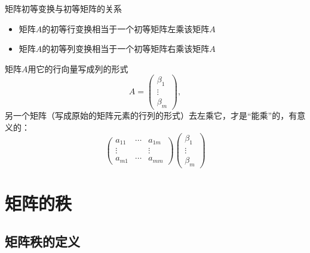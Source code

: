 \begin{frame}

\begin{block}{矩阵初等变换与初等矩阵的关系}
\begin{itemize}
\item 矩阵$A$的初等{\color{red}行}变换相当于一个初等矩阵{\color{red}左乘}该矩阵$A$
\item 矩阵$A$的初等{\color{green}列}变换相当于一个初等矩阵{\color{green}右乘}该矩阵$A$
\end{itemize}
\end{block}

\pause

矩阵$A$用它的行向量写成列的形式
$$A = \begin{pmatrix}
\beta_1 \\ \vdots \\ \beta_m
\end{pmatrix},$$
另一个矩阵（写成原始的矩阵元素的行列的形式）去左乘它，才是``能乘''的，有意义的：
$$\begin{pmatrix}
a_{11} & \cdots & a_{1m} \\ \vdots & & \vdots \\ a_{m1} & \cdots & a_{mm}
\end{pmatrix} \begin{pmatrix}
\beta_1 \\ \vdots \\ \beta_m
\end{pmatrix}$$

\end{frame}


\section{矩阵的秩}


\subsection{矩阵秩的定义}


